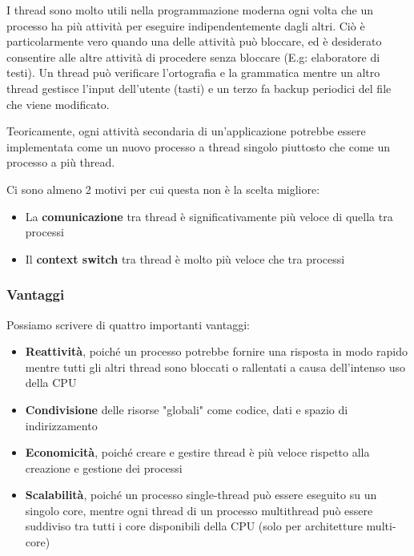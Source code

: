 \documentclass{article}
\begin{document}
I thread sono molto utili nella programmazione moderna ogni volta che un processo ha più attività per eseguire indipendentemente dagli altri. Ciò è particolarmente vero quando una delle attività può bloccare, ed è desiderato consentire alle altre attività di procedere senza bloccare (E.g: elaboratore di testi). Un thread può verificare l'ortografia e la grammatica mentre un altro thread gestisce l'input dell'utente (tasti) e un terzo fa backup periodici del file che viene modificato. \par
Teoricamente, ogni attività secondaria di un'applicazione potrebbe essere implementata come un nuovo processo a thread singolo piuttosto che come un processo a più thread.\par
Ci sono almeno 2 motivi per cui questa non è la scelta migliore:
\begin{itemize}
    \item La \textbf{comunicazione} tra thread è significativamente più veloce di quella tra processi 
    \item Il \textbf{context switch} tra thread è molto più veloce che tra processi
\end{itemize}


\subsubsection{Vantaggi}
Possiamo scrivere di quattro importanti vantaggi:
\begin{itemize}
    \item \textbf{Reattività}, poiché un processo potrebbe fornire una risposta in modo rapido mentre tutti gli altri thread sono bloccati o rallentati a causa dell'intenso uso della CPU
    \item \textbf{Condivisione} delle risorse "globali" come codice, dati e spazio di indirizzamento
    \item \textbf{Economicità}, poiché creare e gestire thread è più veloce rispetto alla creazione e gestione dei processi
    \item \textbf{Scalabilità}, poiché un processo single-thread può essere eseguito su un singolo core, mentre ogni thread di un processo multithread può essere suddiviso tra tutti i core disponibili della CPU (solo per architetture multi-core)
\end{itemize}
\end{document}
